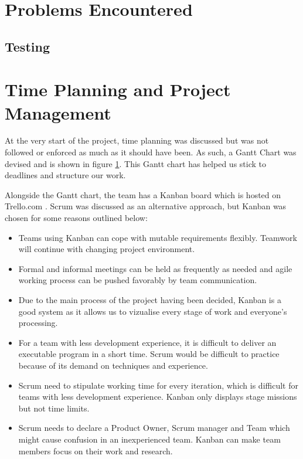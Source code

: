 \documentclass[titlepage]{article}
\begin{document}
\section{Problems Encountered}

\subsection{Testing}

\section{Time Planning and Project Management}
At the very start of the project, time planning was discussed but was not followed or enforced as much as it should have been. As such, a Gantt Chart was devised and is shown in figure \ref{ganttchart}. This Gantt chart has helped us stick to deadlines and structure our work.

\begin{figure}\label{ganttchart}
  
\end{figure}

Alongside the Gantt chart, the team has a Kanban board which is hosted on Trello.com \cite{trello}. Scrum was discussed as an alternative approach, but Kanban was chosen for some reasons outlined below:

\begin{itemize}
\item Teams using Kanban can cope with mutable requirements flexibly. Teamwork will continue with changing project environment.
\item Formal and informal meetings can be held as frequently as needed and agile working process can be pushed favorably by team communication.
\item Due to the main process of the project having been decided, Kanban is a good system as it allows us to vizualise every stage of work and everyone’s processing.
\item For a team with less development experience, it is difficult to deliver an executable program in a short time. Scrum would be difficult to practice because of its demand on techniques and experience.
\item Scrum need to stipulate working time for every iteration, which is difficult for teams with less development experience. Kanban only displays stage missions but not time limits.
\item Scrum needs to declare a Product Owner, Scrum manager and Team which might cause confusion in an inexperienced team. Kanban can make team members focus on their work and research.
\end{itemize}
\end{document}
